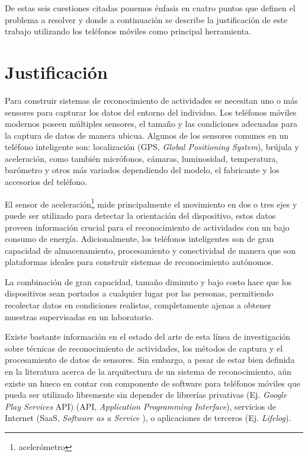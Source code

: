 De estas seis cuestiones citadas ponemos énfasis en cuatro puntos
que definen el problema a resolver y donde a continuación se describe
la justificación de este trabajo utilizando los teléfonos móviles
como principal herramienta.

\section{Justificación}

\label{justificaciuxf3n}

Para construir sistemas de reconocimiento de actividades se necesitan
uno o más sensores para capturar los datos del entorno del individuo.
Los teléfonos móviles modernos poseen múltiples sensores, el tamaño
y las condiciones adecuadas para la captura de datos de manera ubicua.
Algunos de los sensores comunes en un teléfono inteligente son: localización
(GPS,
\emph{Global Positioning System}), brújula y aceleración, como también
micrófonos, cámaras, luminosidad, temperatura, barómetro y otros más
variados dependiendo del modelo, el fabricante y los accesorios del
teléfono\cite{Kwapisz2011}.

El sensor de aceleración\footnote{acelerómetro} mide principalmente
el movimiento en dos o tres ejes y puede ser utilizado para detectar
la orientación del dispositivo, estos datos proveen información crucial
para el reconocimiento de actividades con un bajo consumo de energía.
Adicionalmente, los teléfonos inteligentes son de gran capacidad de
almacenamiento, procesamiento y conectividad de manera que son plataformas
ideales para construir sistemas de reconocimiento autónomos.

La combinación de gran capacidad, tamaño diminuto y bajo costo hace
que los dispositivos sean portados a cualquier lugar por las personas,
permitiendo recolectar datos en condiciones realistas, completamente
ajenas a obtener muestras supervisadas en un laboratorio\cite{Bao2004}. 

Existe bastante información en el estado del arte de esta línea de
investigación sobre técnicas de reconocimiento de actividades, los
métodos de captura y el procesamiento de datos de sensores\cite{LaraLabrador2012}\cite{Kwapisz2011}.
Sin embargo, a pesar de estar bien definida en la literatura acerca
de la arquitectura de un sistema de reconocimiento, aún existe un
hueco en contar con componente de software para teléfonos móviles
que pueda ser utilizado libremente sin depender de librerías privativas
(Ej. \emph{Google Play Services} API) (API,
\emph{Application Programming Interface}), servicios de Internet (SaaS,
\emph{Software as a Service} ), o aplicaciones de terceros (Ej. \emph{Lifelog}).

